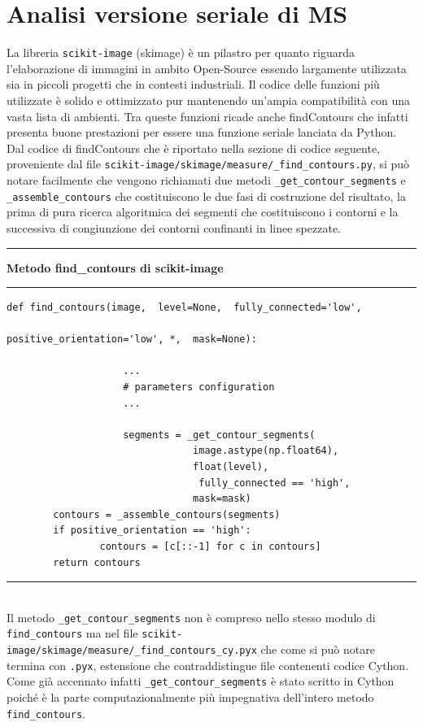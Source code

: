 \documentclass[12pt,a4paper]{report}
\begin{document}
\section{Analisi versione seriale di MS}
La libreria \verb|scikit-image| (skimage) è un pilastro per quanto riguarda l'elaborazione di immagini in ambito Open-Source essendo largamente utilizzata sia in piccoli progetti che in contesti industriali.  Il codice delle funzioni più utilizzate è solido e ottimizzato pur mantenendo un'ampia compatibilità con una vasta lista di ambienti. 
Tra queste funzioni ricade anche findContours che infatti presenta buone prestazioni per essere una funzione seriale lanciata da Python.\newline
Dal codice di findContours che è riportato nella sezione di codice seguente, proveniente dal file \verb|scikit-image/skimage/measure/_find_contours.py|, si può notare facilmente che vengono richiamati due metodi \verb|_get_contour_segments| e \verb|_assemble_contours| che costituiscono le due fasi di costruzione del risultato, la prima di pura ricerca algoritmica dei segmenti che costituiscono i contorni e la successiva di congiunzione dei contorni confinanti in linee spezzate. \\[10pt]
\noindent\rule[0.5ex]{\linewidth}{2pt}
\small{\textbf{Metodo find\_contours di scikit-image}} \\
\noindent\rule[0.5ex]{\linewidth}{1pt}
\begin{lstlisting}
def find_contours(image,  level=None,  fully_connected='low', 
																		positive_orientation='low', *,  mask=None):

					...
					# parameters configuration
					...	

					segments = _get_contour_segments(
					 			image.astype(np.float64), 
					 			float(level),
								 fully_connected == 'high', 
					 			mask=mask)
    	contours = _assemble_contours(segments)
    	if positive_orientation == 'high':
        		contours = [c[::-1] for c in contours]
    	return contours
\end{lstlisting}
\noindent\rule[0.5ex]{\linewidth}{1pt} \\[10pt]
Il metodo \verb|_get_contour_segments| non è compreso nello stesso modulo di  \verb|find_contours| ma nel file \verb|scikit-image/skimage/measure/_find_contours_cy.pyx| che come si può notare termina con \verb|.pyx|, estensione che contraddistingue file contenenti codice Cython.  Come già accennato infatti \verb|_get_contour_segments| è stato scritto in Cython poiché è la parte computazionalmente più impegnativa dell'intero metodo \verb|find_contours|.  \newline
\end{document}

